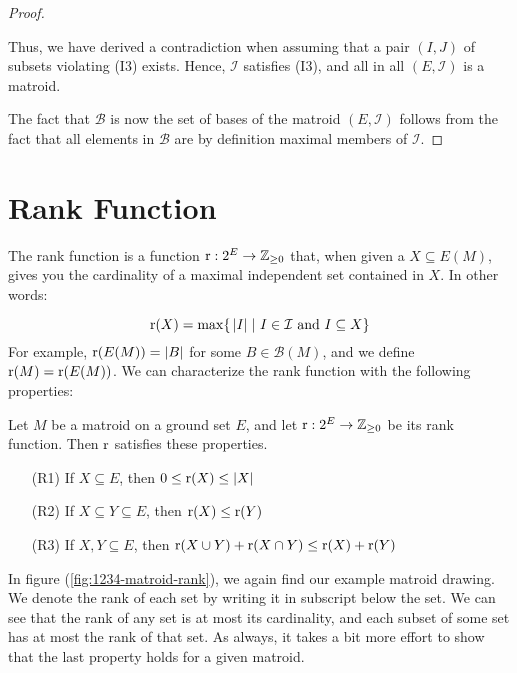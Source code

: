 \begin{proof}
\begin{enumerate}
        Thus, we have derived a contradiction when assuming that a pair $(I, J)$ of subsets violating (I3) exists. Hence, $\mathcal{I}$ satisfies (I3), and all in all $(E,\mathcal{I})$ is a matroid.
    \end{enumerate}  

    
    The fact that $\mathcal{B}$ is now the set of bases of the matroid $(E,\mathcal{I})$ follows from the fact that all elements in $\mathcal{B}$ are by definition maximal members of $\mathcal{I}$.
\end{proof}

\newpage



\newpage
\section{Rank Function}

The rank function is a function $\operatorname{r} :2^E \rightarrow \mathbb{Z}_{\geq0}$ that, when given a $X\subseteq E(M)$, gives you the cardinality of a maximal independent set contained in $X$. In other words:

$$ \operatorname{r}(X) = \max\{\, |I| \; | \,\, I\in\mathcal{I} \text{ and } I\subseteq X \} $$
For example, $\operatorname{r}(E(M))=|B|$ for some $B\in\mathcal{B}(M)$, and we define $\operatorname{r}(M) = \operatorname{r}(E(M))$. We can characterize the rank function with the following properties:

\begin{theorem}
    Let $M$ be a matroid on a ground set $E$, and let $\operatorname{r} : 2^E \rightarrow \mathbb{Z}_{\geq0}$ be its rank function. Then $\operatorname{r}$ satisfies these properties.
    \begin{enumerate}
        \item[(R1)] If $X\subseteq E$, then $0 \leq \operatorname{r}(X) \leq |X| $
        \item[(R2)] If $X\subseteq Y\subseteq E$, then $\operatorname{r}(X)\leq\operatorname{r}(Y)$
        \item[(R3)] If $X,Y\subseteq E$, then $\operatorname{r}(X\cup Y)+\operatorname{r}(X\cap Y) \leq \operatorname{r}(X)+\operatorname{r}(Y) $
    \end{enumerate}
\end{theorem}

In figure (\ref{fig:1234-matroid-rank}), we again find our example matroid drawing. We denote the rank of each set by writing it in subscript below the set. We can see that the rank of any set is at most its cardinality, and each subset of some set has at most the rank of that set. As always, it takes a bit more effort to show that the last property holds for a given matroid.

